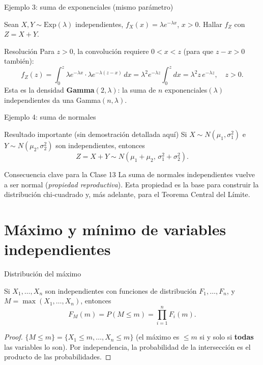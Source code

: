 \documentclass[aspectratio=169,11pt]{beamer}
\begin{document}
\begin{frame}{Ejemplo 3: suma de exponenciales (mismo parámetro)}
\begin{example}
Sean $X,Y\sim\text{Exp}(\lambda)$ independientes, $f_X(x)=\lambda e^{-\lambda x}$, $x>0$. Hallar $f_Z$ con $Z=X+Y$.
\end{example}
\pause
\begin{block}{Resolución}
Para $z>0$, la convolución requiere $0<x<z$ (para que $z-x>0$ también):
\[
f_Z(z) = \int_0^{z} \lambda e^{-\lambda x} \cdot \lambda e^{-\lambda(z-x)}\, dx = \lambda^2 e^{-\lambda z} \int_0^z dx = \lambda^2 z\, e^{-\lambda z}, \quad z>0.
\]
Esta es la densidad \textbf{Gamma$(2,\lambda)$}: la suma de $n$ exponenciales$(\lambda)$ independientes da una Gamma$(n,\lambda)$.
\end{block}
\end{frame}

\begin{frame}{Ejemplo 4: suma de normales}
\begin{block}{Resultado importante (sin demostración detallada aquí)}
Si $X\sim N(\mu_1,\sigma_1^2)$ e $Y\sim N(\mu_2,\sigma_2^2)$ son independientes, entonces
\[
Z = X+Y \sim N(\mu_1+\mu_2, \, \sigma_1^2+\sigma_2^2).
\]
\end{block}
\begin{alertblock}{Consecuencia clave para la Clase 13}
La suma de normales independientes vuelve a ser normal (\emph{propiedad reproductiva}). Esta propiedad es la base para construir la distribución chi-cuadrado y, más adelante, para el Teorema Central del Límite.
\end{alertblock}
\end{frame}

\section{Máximo y mínimo de variables independientes}

\begin{frame}{Distribución del máximo}
\begin{theorem}
Si $X_1,\ldots,X_n$ son independientes con funciones de distribución $F_1,\ldots,F_n$, y $M=\max(X_1,\ldots,X_n)$, entonces
\[
F_M(m) = P(M\le m) = \prod_{i=1}^n F_i(m).
\]
\end{theorem}
\begin{proof}
$\{M\le m\} = \{X_1\le m, \ldots, X_n\le m\}$ (el máximo es $\le m$ si y solo si \textbf{todas} las variables lo son). Por independencia, la probabilidad de la intersección es el producto de las probabilidades. \qedhere
\end{proof}
\end{frame}
\end{document}
